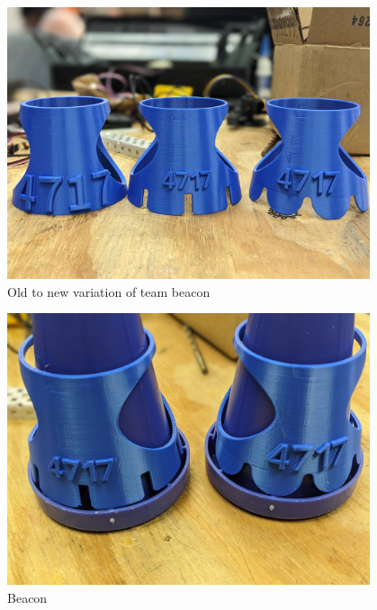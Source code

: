 \begin{figure}[ht]
  \centering
\begin{minipage}[b]{.48\textwidth}
  \includegraphics[width=0.95\textwidth]{Meetings/January/01-24-23/TElement.jpg}
  \caption{Old to new variation of team beacon}
  \label{fig:pic1}
\end{minipage}
\end{figure}

\begin{figure}[ht]
  \centering
\begin{minipage}[b]{.48\textwidth}
  \includegraphics[width=0.95\textwidth]{Meetings/January/01-24-23/TElement2.jpg}
  \caption{Beacon}
  \label{How our new (right) team beacon fits on a cone}
\end{minipage}
\end{figure}


